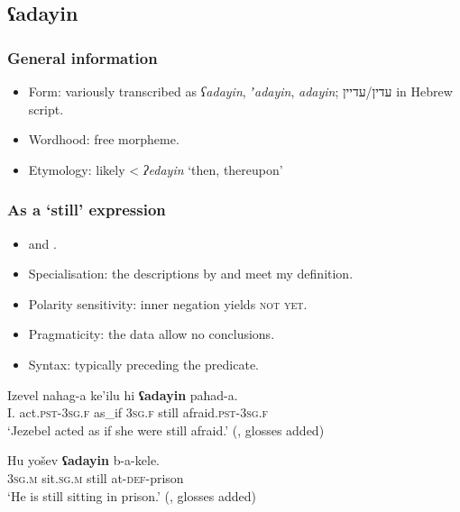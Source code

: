 \subsection{ʕadayin}
\label{appendixHebrewAdayin}

\subsubsection{General information}
	\begin{itemize}
		\item Form: variously transcribed as \textit{ʕadayin}, \textit{ʼadayin}, \textit{adayin}; עדין/עדיין in Hebrew script.
		\item Wordhood: free morpheme.
		\item Etymology: likely <  \textit{ʔedayin} \lq then, thereupon\rq{}
	\end{itemize}


\subsubsection{As a \lq{}still\rq{ }expression}
\begin{itemize}
	\item \textcite{Tobin1985} and \textcite{TsirkinSadan2019}.
	\item Specialisation: the descriptions by \citeauthor{Tobin1985} and \citeauthor{TsirkinSadan2019} meet my definition.
	\item Polarity sensitivity: inner negation yields \textsc{not yet}.
	\item Pragmaticity: the data allow no conclusions.
	\item Syntax: typically preceding the predicate.
\end{itemize}

\begin{exe}
	\ex \gll Izevel nahag-a ke\rq{}ilu hi \textbf{ʕadayin} paħad-a.\\
	I. act.\textsc{pst}-3\textsc{sg}.\textsc{f} as\_if 3\textsc{sg}.\textsc{f} still afraid.\textsc{pst}-3\textsc{sg}.\textsc{f}\\
	\glt \lq Jezebel acted as if she were still afraid.\rq{ }(\cite[136]{Glinert1989}, glosses added)

	\ex \gll Hu yošev \textbf{ʕadayin} b-a-kele.\\
	3\textsc{sg}.\textsc{m} sit.\textsc{sg}.\textsc{m} still at-\textsc{def}-prison\\
	\glt \lq He is still sitting in prison.' (\cite[358]{AronsonBerman1978}, glosses added)
\end{exe}

